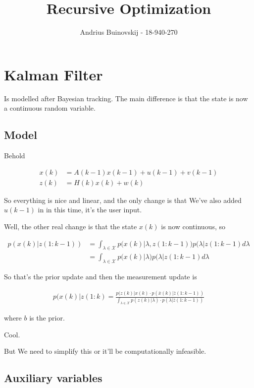 \documentclass{article}
\begin{document}
\title{Recursive Optimization}
\author{Andrius Buinovskij - 18-940-270}
\date{}

\maketitle

\section{Kalman Filter}

	Is modelled after Bayesian tracking. The main difference is that the state is now a continuous random variable.
	
	\subsection{Model}
	
		Behold 
		
		\begin{align}
			x(k) &= A(k-1)x(k-1) + u(k-1) + v(k-1)\\
			z(k) &= H(k)x(k) + w(k)
		\end{align}
		
		So everything is nice and linear, and the only change is  that We've also added $u(k-1)$ in in this time, it's the user input. 
		
		Well, the other real change is that the state $x(k)$ is now continuous, so
		
		\begin{align}
			p(x(k)|z(1:k-1)) &= \int_{\lambda\in\mathcal{X}} p(x(k)|\lambda,z(1:k-1)) p(\lambda|z(1:k-1) d\lambda\\
			&= \int_{\lambda\in\mathcal{X}} p(x(k)|\lambda) p(\lambda|z(1:k-1) d\lambda\label{prior}
		\end{align}
		
		So that's the prior update and then the measurement update is
		
		\begin{align}
			p(x(k)|z(1:k) = \frac{p(z(k)|x(k)\cdot p(\bar{x}(k)|\bar{z}(1:k-1))}{\int_{\lambda\in\mathcal{X}} p(z(k)|\lambda) \cdot p(\lambda|\bar{z}(1:k-1))}
		\end{align}
	
		where $b$ is the prior.
	
		Cool. 
	
		But We need to simplify this or it'll be computationally infeasible.
	
	\subsection{Auxiliary variables}
	
\end{document}

